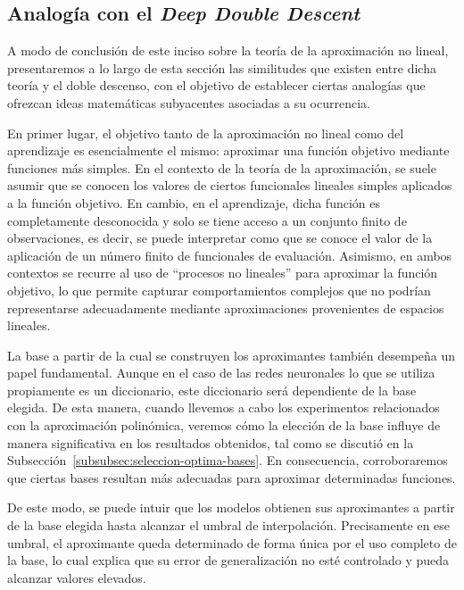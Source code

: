 \subsection{Analogía con el \textit{Deep Double Descent}}\label{subsec:analogia-matematica-ddd}

A modo de conclusión de este inciso sobre la teoría de la aproximación no lineal, presentaremos a lo largo de esta sección las similitudes que existen entre dicha teoría y el doble descenso, con el objetivo de establecer ciertas analogías que ofrezcan ideas matemáticas subyacentes asociadas a su ocurrencia.

En primer lugar, el objetivo tanto de la aproximación no lineal como del aprendizaje es esencialmente el mismo: aproximar una función objetivo mediante funciones más simples. En el contexto de la teoría de la aproximación, se suele asumir que se conocen los valores de ciertos funcionales lineales simples aplicados a la función objetivo. En cambio, en el aprendizaje, dicha función es completamente desconocida y solo se tiene acceso a un conjunto finito de observaciones, es decir, se puede interpretar como que se conoce el valor de la aplicación de un número finito de funcionales de evaluación. Asimismo, en ambos contextos se recurre al uso de ``procesos no lineales'' para aproximar la función objetivo, lo que permite capturar comportamientos complejos que no podrían representarse adecuadamente mediante aproximaciones provenientes de espacios lineales.

La base a partir de la cual se construyen los aproximantes también desempeña un papel fundamental. Aunque en el caso de las redes neuronales lo que se utiliza propiamente es un diccionario, este diccionario será dependiente de la base elegida. De esta manera, cuando llevemos a cabo los experimentos relacionados con la aproximación polinómica, veremos cómo la elección de la base influye de manera significativa en los resultados obtenidos, tal como se discutió en la Subsección~\ref{subsubsec:seleccion-optima-bases}. En consecuencia, corroboraremos que ciertas bases resultan más adecuadas para aproximar determinadas funciones. 

De este modo, se puede intuir que los modelos obtienen sus aproximantes a partir de la base elegida hasta alcanzar el umbral de interpolación. Precisamente en ese umbral, el aproximante queda determinado de forma única por el uso completo de la base, lo cual explica que su error de generalización no esté controlado y pueda alcanzar valores elevados.

